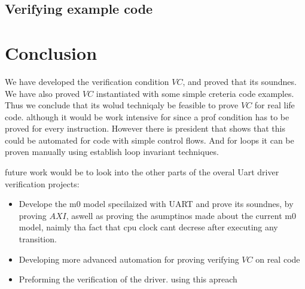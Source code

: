 \documentclass{article}
\begin{document}
\subsection{Verifying example code}

\section{Conclusion}

We have developed the verification condition $VC$, and proved that its soundnes. We have also proved $VC$ instantiated with some simple creteria code examples. Thus we conclude that its wolud techniqaly be feasible to prove $VC$ for real life code. although it would be work intensive for since a prof condition has to be proved for every instruction. However there is president that shows that this could be automated for code with simple control flows. And for loops it can be proven manually using establish loop invariant techniques.

future work would be to look into the other parts of the overal Uart driver verification projects:
\begin{itemize}
    \item Develope the m0 model specilaized with UART and prove its soundnes, by proving $AXI$, aswell as proving the asumptinos made about the current m0 model, naimly tha fact that cpu clock cant decrese after executing any transition.
    \item Developing more advanced automation for proving verifying $VC$ on real code
    \item Preforming the verification of the driver. using this apreach
\end{itemize}


\end{document}
